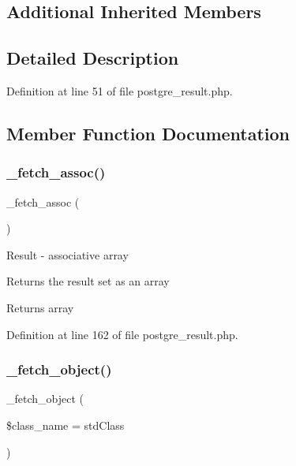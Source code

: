 \subsection*{Additional Inherited Members}


\subsection{Detailed Description}


Definition at line 51 of file postgre\+\_\+result.\+php.



\subsection{Member Function Documentation}
\mbox{\label{class_c_i___d_b__postgre__result_a43a9a92817f1334a1c10752ec44275a0}} 
\subsubsection{\texorpdfstring{\_fetch\_assoc()}{\_fetch\_assoc()}}
{\footnotesize\ttfamily \+\_\+fetch\+\_\+assoc (\begin{DoxyParamCaption}{ }\end{DoxyParamCaption})\hspace{0.3cm}{\ttfamily [protected]}}

Result -\/ associative array

Returns the result set as an array

\begin{DoxyReturn}{Returns}
array 
\end{DoxyReturn}


Definition at line 162 of file postgre\+\_\+result.\+php.

\mbox{\label{class_c_i___d_b__postgre__result_a60806be6a9c2488820813c2a7f4fef71}} 
\subsubsection{\texorpdfstring{\_fetch\_object()}{\_fetch\_object()}}
{\footnotesize\ttfamily \+\_\+fetch\+\_\+object (\begin{DoxyParamCaption}\item[{}]{\$class\+\_\+name = {\ttfamily \textquotesingle{}stdClass\textquotesingle{}} }\end{DoxyParamCaption})\hspace{0.3cm}{\ttfamily [protected]}}

